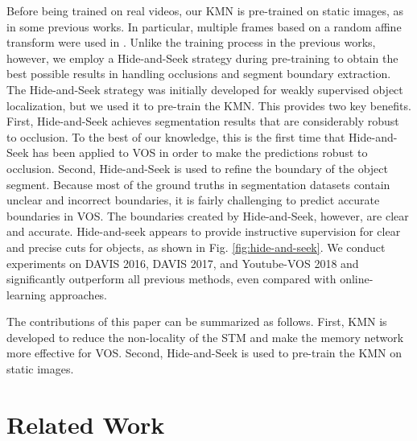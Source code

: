 \documentclass[runningheads]{llncs}
\begin{document}
Before being trained on real videos, our KMN is pre-trained on static images, as in some previous works. In particular, multiple frames based on a random affine transform were used in \cite{wug2018fast,Oh_2019_ICCV}. Unlike the training process in the previous works, however, we employ a Hide-and-Seek strategy during pre-training to obtain the best possible results in handling occlusions and segment boundary extraction. The Hide-and-Seek strategy \cite{singh2017hide} was initially developed for weakly supervised object localization, but we used it to pre-train the KMN. This provides two key benefits. First, Hide-and-Seek achieves segmentation results that are considerably robust to occlusion. To the best of our knowledge, this is the first time that Hide-and-Seek has been applied to VOS in order to make the predictions robust to occlusion. Second, Hide-and-Seek is used to refine the boundary of the object segment. Because most of the ground truths in segmentation datasets contain unclear and incorrect boundaries, it is fairly challenging to predict accurate boundaries in VOS. The boundaries created by Hide-and-Seek, however, are clear and accurate. Hide-and-seek appears to provide instructive supervision for clear and precise cuts for objects, as shown in Fig. \ref{fig:hide-and-seek}. We conduct experiments on DAVIS 2016, DAVIS 2017, and Youtube-VOS 2018 and significantly outperform all previous methods, even compared with online-learning approaches.

The contributions of this paper can be summarized as follows. First, KMN is developed to reduce the non-locality of the STM and make the memory network more effective for VOS. Second, Hide-and-Seek is used to pre-train the KMN on static images.




\section{Related Work}
\label{s2}
\end{document}
